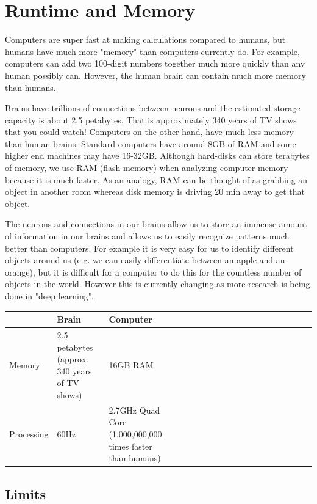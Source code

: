 \documentclass[11pt,oneside]{book}
\begin{document}
\section{Runtime and Memory}

Computers are super fast at making calculations compared to humans, but humans have much more "memory" than computers currently do. For example, computers can add two 100-digit numbers together much more quickly than any human possibly can. However, the human brain can contain much more memory than humans.

Brains have trillions of connections between neurons and the estimated storage capacity is about 2.5 petabytes. That is approximately 340 years of TV shows that you could watch! Computers on the other hand, have much less memory than human brains. Standard computers have around 8GB of RAM and some higher end machines may have 16-32GB. Although hard-disks can store terabytes of memory, we use RAM (flash memory) when analyzing computer memory because it is much faster. As an analogy, RAM can be thought of as grabbing an object in another room whereas disk memory is driving 20 min away to get that object.

The neurons and connections in our brains allow us to store an immense amount of information in our brains and allows us to easily recognize patterns much better than computers. For example it is very easy for us to identify different objects around us (e.g. we can easily differentiate between an apple and an orange), but it is difficult for a computer to do this for the countless number of objects in the world. However this is currently changing as more research is being done in "deep learning".

\vspace{10pt} \begin{tabular}{|l|l|l|l|l|l|l|l|l|l|l|l|l|l|l|l|l|l|l}\hline


   &
  Brain &
  Computer\\
\hline


  Memory &
  2.5 petabytes (approx. 340 years of TV shows) &
  16GB RAM\\

  Processing &
  60Hz &
  2.7GHz Quad Core (1,000,000,000 times faster than humans)\\

\hline\end{tabular}

\subsection{Limits}
\end{document}
